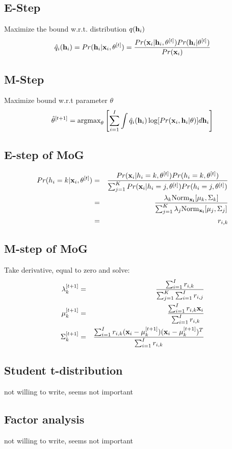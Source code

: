 \documentclass[12pt,a4paper]{article}
\begin{document}
\subsection*{E-Step}
Maximize the bound w.r.t. distribution $q({\bf h}_i)$
$$
\hat q_i({\bf h}_i) = Pr({\bf h}_i|{\bf x}_i,{\bf \theta}^{[t]}) = \frac{ Pr({\bf x}_i|{\bf h}_i,{\bf \theta}^{[t]})Pr({\bf h}_i|\theta^{[t]})}{Pr({\bf x}_i)}
$$
\subsection*{M-Step}
Maximize bound w.r.t parameter $\theta$
$$
\hat \theta^{[t+1]} = {\rm argmax}_{\theta}\left[\sum_{i=1}^{I}\int \hat q_i({\bf h}_i)\log [Pr({\bf x}_i,{\bf h}_i|\theta)] d{\bf h}_i\right]
$$
\subsection*{E-step of MoG}
\begin{eqnarray*}
Pr(h_i=k|{\bf x}_i,\theta^{[t]}) &=& \frac{Pr({\bf x}_i|h_i=k,\theta^{[t]})Pr(h_i=k,\theta^{[t]})}{\sum_{j=1}^{K}Pr({\bf x}_i|h_i=j,\theta^{[t]})Pr(h_i=j,\theta^{[t]})}\\
&=& \frac{\lambda_k {\rm Norm}_{\bf x_i}[\mu_k,\Sigma_k]}{\sum_{j=1}^{K}\lambda_j {\rm Norm}_{\bf x_i}[\mu_j,\Sigma_j]}\\
&=& r_{i,k}
\end{eqnarray*}
\subsection*{M-step of MoG}
Take derivative, equal to zero and solve:
\begin{eqnarray*}
\lambda_k^{[t+1]} &=& \frac{\sum_{i=1}^{I} r_{i,k}}{\sum_{j=1}^{K}\sum_{i=1}^{I}r_{i,j}} \\
\mu_k^{[t+1]} &=& \frac{\sum_{i=1}^{I}r_{i,k}{\bf x}_i}{\sum_{i=1}^{I}r_{i,k}}\\
\Sigma_k^{[t+1]} &=& \frac{\sum_{i=1}^{I}r_{i,k}({\bf x}_i-\mu_k^{[t+1]})({\bf x}_i-\mu_k^{[t+1]})^T}{\sum_{i=1}^{I}r_{i,k}} 
\end{eqnarray*}
\subsection*{Student t-distribution}
not willing to write, seems not important
\subsection*{Factor analysis}
not willing to write, seems not important
\end{document}
